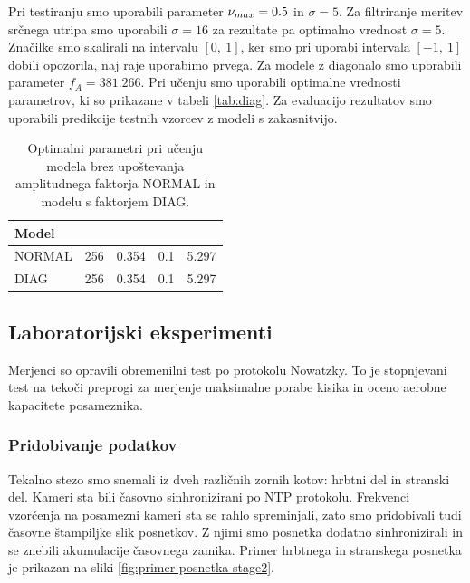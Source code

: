 Pri testiranju smo uporabili parameter $\nu_{max} = 0.5$ in $\sigma=5$. Za filtriranje meritev srčnega utripa smo uporabili $\sigma=16$ za rezultate pa optimalno vrednost $\sigma=5$. Značilke smo skalirali na intervalu $[0,~1]$,  ker smo pri uporabi intervala $[-1,~1]$ dobili opozorila, naj raje uporabimo prvega. Za modele z diagonalo smo uporabili parameter $f_{A}=381.266$. Pri učenju smo uporabili optimalne vrednosti parametrov, ki so prikazane v tabeli \ref{tab:diag}. Za evaluacijo rezultatov smo uporabili predikcije testnih vzorcev z modeli s zakasnitvijo.



\begin{table}[htb]
	\centering
	\begin{tabular}{l S[table-format=3] S[table-format=1.3] S[table-format=1.1] S[table-format=1.3]}
		\toprule
		\textbf{Model} &  & \thead{$\mathbf{\gamma}$} & \thead{$\mathbf{\nu}$} &  \\ 
		\midrule
		NORMAL & 256 & 0.354 & 0.1 & 5.297 \\
		DIAG & 256 & 0.354 & 0.1 & 5.297 \\
		\bottomrule
	\end{tabular}
	\caption[]{Optimalni parametri pri učenju modela brez upoštevanja amplitudnega faktorja NORMAL in modelu s faktorjem DIAG.}
	\label{tab:izbira-param-diag}
\end{table}


\subsection{Laboratorijski eksperimenti}
Merjenci so opravili obremenilni test po protokolu Nowatzky. To je stopnjevani test na tekoči preprogi za merjenje maksimalne porabe kisika in oceno aerobne kapacitete posameznika.

\subsubsection{Pridobivanje podatkov}
Tekalno stezo smo snemali iz dveh različnih zornih kotov: hrbtni del in stranski del. Kameri sta bili časovno sinhronizirani po NTP protokolu. Frekvenci vzorčenja na posamezni kameri sta se rahlo spreminjali, zato smo pridobivali tudi časovne štampiljke slik posnetkov. Z njimi smo posnetka dodatno sinhronizirali in se znebili akumulacije časovnega zamika.  Primer hrbtnega in stranskega posnetka je prikazan na sliki \ref{fig:primer-posnetka-stage2}.

